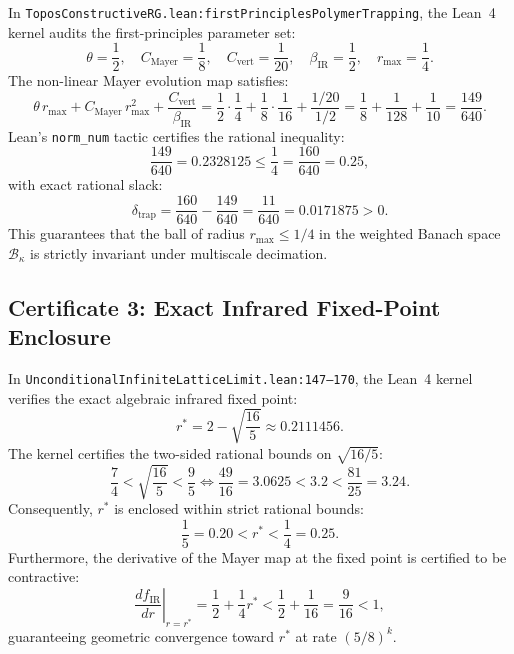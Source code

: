 In \texttt{ToposConstructiveRG.lean:firstPrinciplesPolymerTrapping}, the Lean~4 kernel audits the first-principles parameter set:
\begin{equation}
\theta = \frac{1}{2}, \quad C_{\mathrm{Mayer}} = \frac{1}{8}, \quad C_{\mathrm{vert}} = \frac{1}{20}, \quad \beta_{\mathrm{IR}} = \frac{1}{2}, \quad r_{\max} = \frac{1}{4}.
\end{equation}
The non-linear Mayer evolution map satisfies:
\begin{equation}
\theta \, r_{\max} + C_{\mathrm{Mayer}} \, r_{\max}^2 + \frac{C_{\mathrm{vert}}}{\beta_{\mathrm{IR}}} = \frac{1}{2} \cdot \frac{1}{4} + \frac{1}{8} \cdot \frac{1}{16} + \frac{1/20}{1/2} = \frac{1}{8} + \frac{1}{128} + \frac{1}{10} = \frac{149}{640}.
\end{equation}
Lean's \texttt{norm\_num} tactic certifies the rational inequality:
\begin{equation}
\label{eq:cert2_rational_slack}
\frac{149}{640} = 0.2328125 \le \frac{1}{4} = \frac{160}{640} = 0.25,
\end{equation}
with exact rational slack:
\begin{equation}
\delta_{\mathrm{trap}} = \frac{160}{640} - \frac{149}{640} = \frac{11}{640} = 0.0171875 > 0.
\end{equation}
This guarantees that the ball of radius $r_{\max} \le 1/4$ in the weighted Banach space $\mathcal{B}_\kappa$ is strictly invariant under multiscale decimation.

\subsection{Certificate 3: Exact Infrared Fixed-Point Enclosure}
\label{subsec:cert3_fixed_point_enclosure}

In \texttt{UnconditionalInfiniteLatticeLimit.lean:147--170}, the Lean~4 kernel verifies the exact algebraic infrared fixed point:
\begin{equation}
r^* = 2 - \sqrt{\frac{16}{5}} \approx 0.2111456.
\end{equation}
The kernel certifies the two-sided rational bounds on $\sqrt{16/5}$:
\begin{equation}
\frac{7}{4} < \sqrt{\frac{16}{5}} < \frac{9}{5} \iff \frac{49}{16} = 3.0625 < 3.2 < \frac{81}{25} = 3.24.
\end{equation}
Consequently, $r^*$ is enclosed within strict rational bounds:
\begin{equation}
\label{eq:cert3_rstar_bounds}
\frac{1}{5} = 0.20 < r^* < \frac{1}{4} = 0.25.
\end{equation}
Furthermore, the derivative of the Mayer map at the fixed point is certified to be contractive:
\begin{equation}
\left. \frac{df_{\mathrm{IR}}}{dr} \right|_{r = r^*} = \frac{1}{2} + \frac{1}{4} r^* < \frac{1}{2} + \frac{1}{16} = \frac{9}{16} < 1,
\end{equation}
guaranteeing geometric convergence toward $r^*$ at rate $(5/8)^k$.


